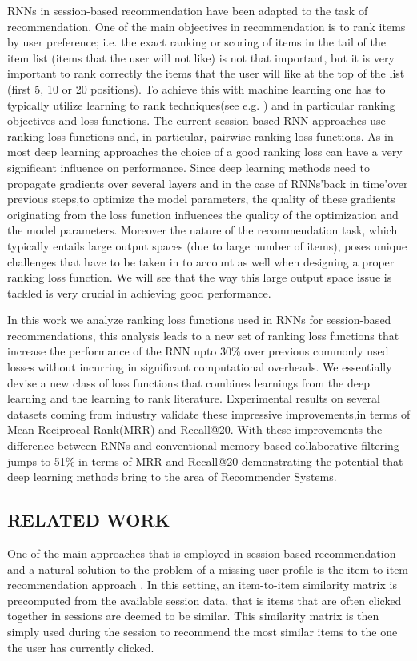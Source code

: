 \documentclass{article} %
\begin{document}
RNNs in session-based recommendation have been adapted to the task of recommendation. One of the main objectives in recommendation is to rank items by user preference; i.e. the exact ranking or scoring of items in the tail of the item list (items that the user will not like) is not that important, but it is very important to rank correctly the items that the user will like at the top of the list (ﬁrst 5, 10 or 20 positions). To achieve this with machine learning one has to typically utilize learning to rank techniques(see e.g. \cite{burges2010ranknet}) and in particular ranking objectives and loss functions. The current session-based RNN approaches use ranking loss functions and, in particular, pairwise ranking loss functions. As in most deep learning approaches the choice of a good ranking loss can have a very signiﬁcant inﬂuence on performance. Since deep learning methods need to propagate gradients over several layers and in the case of RNNs’back in time’over previous steps,to optimize the model parameters, the quality of these gradients originating from the loss function inﬂuences the quality of the optimization and the model parameters. Moreover the nature of the recommendation task, which typically entails large output spaces (due to large number of items), poses unique challenges that have to be taken in to account as well when designing a proper ranking loss function. We will see that the way this large output space issue is tackled is very crucial in achieving good performance.

In this work we analyze ranking loss functions used in RNNs for session-based recommendations, this analysis leads to a new set of ranking loss functions that increase the performance of the RNN upto 30\% over previous commonly used losses without incurring in signiﬁcant computational overheads. We essentially devise a new class of loss functions that combines learnings from the deep learning and the learning to rank literature. Experimental results on several datasets coming from industry validate these impressive improvements,in terms of Mean Reciprocal Rank(MRR) and Recall@20. With these improvements the difference between RNNs and conventional memory-based collaborative ﬁltering jumps to 51\% in terms of MRR and Recall@20 demonstrating the potential that deep learning methods bring to the area of Recommender Systems.



\subsection{RELATED WORK}
One of the main approaches that is employed in session-based recommendation and a natural solution to the problem of a missing user proﬁle is the item-to-item recommendation approach \cite{sarwar2001item}. In this setting, an item-to-item similarity matrix is precomputed from the available session data, that is items that are often clicked together in sessions are deemed to be similar. This similarity matrix is then simply used during the session to recommend the most similar items to the one the user has currently clicked. 
\end{document}
